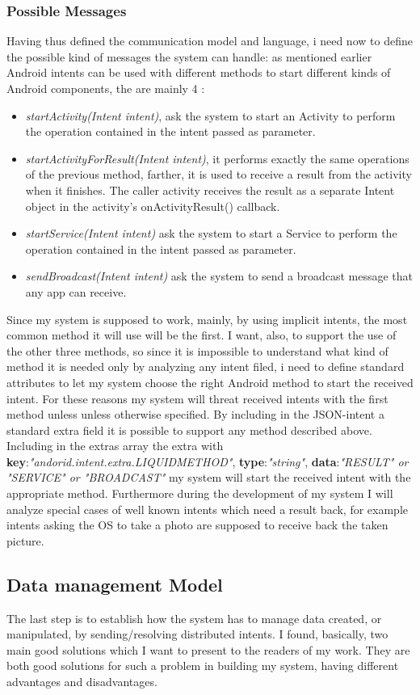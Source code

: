 \subsubsection{Possible Messages}
Having thus defined the communication model and language, i need now to define the possible kind of messages the system can handle: as mentioned earlier Android intents can be used with different methods to start different kinds of Android components, the are mainly 4 : 
\begin{itemize}
	\item \textit{startActivity(Intent intent)}, ask the system to start an Activity to perform the operation contained in the intent passed as parameter.
	\item \textit{startActivityForResult(Intent intent)}, it performs exactly the same operations of the previous method, farther, it is used to receive a result from the activity when it finishes. The caller activity receives the result as a separate Intent object in the activity's onActivityResult() callback.
	\item \textit{startService(Intent intent)} ask the system to start a Service to perform the operation contained in the intent passed as parameter.
	\item \textit{sendBroadcast(Intent intent)} ask the system to send a broadcast message that any app can receive.
\end{itemize}
Since my system is supposed to work, mainly, by using implicit intents, the most common method it will use will be the first. I want, also, to support the use of the other three methods, so since it is impossible to understand what kind of method it is needed only by analyzing any intent filed, i need to define standard attributes to let my system choose the right Android method to start the received intent. For these reasons my system will threat received intents with the first method unless unless otherwise specified. By including in the JSON-intent a standard extra field it is possible to support any method described above. Including in the extras array the extra with \textbf{key}:\textit{"andorid.intent.extra.LIQUIDMETHOD"}, \textbf{type}:\textit{"string"}, \textbf{data}:\textit{"RESULT" or "SERVICE" or "BROADCAST"} my system will start the received intent with the appropriate method. Furthermore during the development of my system I will analyze special cases of well known intents which need a result back, for example intents asking the OS to take a photo are supposed to receive back the taken picture.
 \subsection{Data management Model}
 The last step is to establish how the system has to manage data created, or manipulated, by sending/resolving distributed intents. I found, basically, two main good solutions which I want to present to the readers of my work. They are both good solutions for such a problem in building my system, having different advantages and disadvantages.
